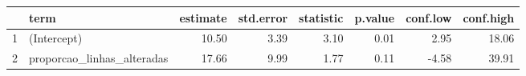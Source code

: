 \begin{table}[ht]
\centering
\begin{tabular}{rlrrrrrr}
  \hline
 & term & estimate & std.error & statistic & p.value & conf.low & conf.high \\ 
  \hline
1 & (Intercept) & 10.50 & 3.39 & 3.10 & 0.01 & 2.95 & 18.06 \\ 
  2 & proporcao\_linhas\_alteradas & 17.66 & 9.99 & 1.77 & 0.11 & -4.58 & 39.91 \\ 
   \hline
\end{tabular}
\end{table}
